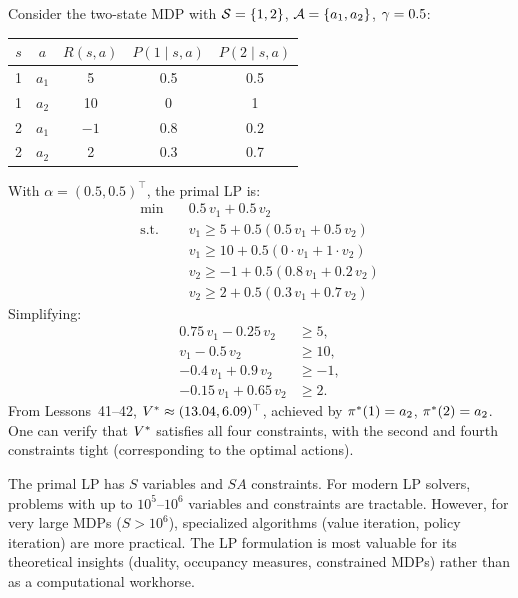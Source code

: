 \documentclass[11pt,a4paper]{article}
\begin{document}
\begin{example}
\label{ex:primal-two-state}
Consider the two-state MDP with $\mathcal{S} = \{1, 2\}$,
$\mathcal{A} = \{a_1, a_2\}$, $\gamma = 0.5$:
\begin{center}
\begin{tabular}{ccccc}
\toprule
$s$ & $a$ & $R(s,a)$ & $P(1 \mid s,a)$ & $P(2 \mid s,a)$ \\
\midrule
1 & $a_1$ & 5 & 0.5 & 0.5 \\
1 & $a_2$ & 10 & 0 & 1 \\
2 & $a_1$ & $-1$ & 0.8 & 0.2 \\
2 & $a_2$ & 2 & 0.3 & 0.7 \\
\bottomrule
\end{tabular}
\end{center}
With $\alpha = (0.5, 0.5)^\top$, the primal LP is:
\begin{align*}
    \min \quad & 0.5\, v_1 + 0.5\, v_2 \\
    \text{s.t.} \quad
    & v_1 \geq 5 + 0.5(0.5\, v_1 + 0.5\, v_2) \\
    & v_1 \geq 10 + 0.5(0 \cdot v_1 + 1 \cdot v_2) \\
    & v_2 \geq -1 + 0.5(0.8\, v_1 + 0.2\, v_2) \\
    & v_2 \geq 2 + 0.5(0.3\, v_1 + 0.7\, v_2)
\end{align*}
Simplifying:
\begin{align*}
    0.75\, v_1 - 0.25\, v_2 &\geq 5, \\
    v_1 - 0.5\, v_2 &\geq 10, \\
    -0.4\, v_1 + 0.9\, v_2 &\geq -1, \\
    -0.15\, v_1 + 0.65\, v_2 &\geq 2.
\end{align*}
From Lessons~41--42, $V^* \approx (13.04, 6.09)^\top$, achieved by
$\pi^*(1) = a_2$, $\pi^*(2) = a_2$. One can verify that
$V^*$ satisfies all four constraints, with the second and fourth
constraints tight (corresponding to the optimal actions).
\end{example}

\begin{warning}[title={LP Size and Practical Considerations}]
The primal LP has $S$ variables and $SA$ constraints. For modern LP
solvers, problems with up to $10^5$--$10^6$ variables and constraints
are tractable. However, for very large MDPs ($S > 10^6$), specialized
algorithms (value iteration, policy iteration) are more practical.
The LP formulation is most valuable for its theoretical insights
(duality, occupancy measures, constrained MDPs) rather than as a
computational workhorse.
\end{warning}
\end{document}
